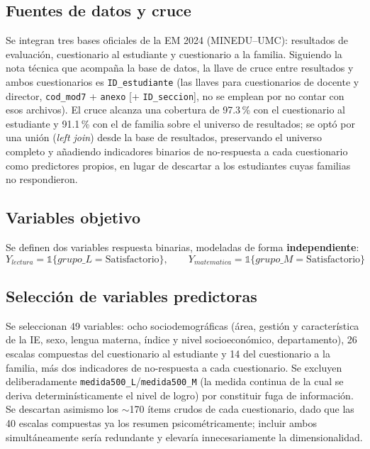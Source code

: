 \documentclass[11pt]{article}
\begin{document}
\subsection{Fuentes de datos y cruce}

Se integran tres bases oficiales de la EM 2024 (MINEDU--UMC): resultados
de evaluación, cuestionario al estudiante y cuestionario a la familia.
Siguiendo la nota técnica que acompaña la base de datos, la llave de
cruce entre resultados y ambos cuestionarios es \texttt{ID\_estudiante}
(las llaves para cuestionarios de docente y director, \texttt{cod\_mod7}
+ \texttt{anexo} [+ \texttt{ID\_seccion}], no se emplean por no contar
con esos archivos). El cruce alcanza una cobertura de 97.3\,\% con el
cuestionario al estudiante y 91.1\,\% con el de familia sobre el
universo de resultados; se optó por una unión (\emph{left join}) desde
la base de resultados, preservando el universo completo y añadiendo
indicadores binarios de no-respuesta a cada cuestionario como
predictores propios, en lugar de descartar a los estudiantes cuyas
familias no respondieron.

\subsection{Variables objetivo}

Se definen dos variables respuesta binarias, modeladas de forma
\textbf{independiente}:
$$Y_{lectura} = \mathbb{1}\{grupo\_L = \text{Satisfactorio}\}, \qquad
Y_{matematica} = \mathbb{1}\{grupo\_M = \text{Satisfactorio}\}$$

\subsection{Selección de variables predictoras}

Se seleccionan 49 variables: ocho sociodemográficas (área, gestión y
característica de la IE, sexo, lengua materna, índice y nivel
socioeconómico, departamento), 26 escalas compuestas del cuestionario al
estudiante y 14 del cuestionario a la familia, más dos indicadores de
no-respuesta a cada cuestionario. Se excluyen deliberadamente
\texttt{medida500\_L}/\texttt{medida500\_M} (la medida continua de la
cual se deriva determinísticamente el nivel de logro) por constituir
fuga de información. Se descartan asimismo los $\sim$170 ítems crudos de
cada cuestionario, dado que las 40 escalas compuestas ya los resumen
psicométricamente; incluir ambos simultáneamente sería redundante y
elevaría innecesariamente la dimensionalidad.
\end{document}

